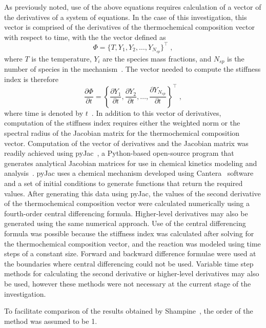 \documentclass[12pt]{ussci}
\begin{document}
As previously noted, use of the above equations requires calculation of a vector of the derivatives of a system of equations.
In the case of this investigation, this vector is comprised of the derivatives of the thermochemical composition vector with respect to time, with the the vector defined as
\begin{equation}
    \Phi = \{T, Y_1, Y_2, \dots, Y_{N_{sp}} \}^\intercal \;,
\end{equation}
where $T$ is the temperature, $Y_i$ are the species mass fractions, and $N_{sp}$ is the number of species in the mechanism~\cite{Niemeyer:2017}.
The vector needed to compute the stiffness index is therefore
\begin{equation}
    \frac{\partial \Phi}{\partial t} = \left\{\frac{\partial Y_1}{\partial t}, \frac{\partial Y_2}{\partial t}, \dots, \frac{\partial Y_{N_{sp}}}{\partial t} \right\}^\intercal \;,
\end{equation}
where time is denoted by $t$~\cite{Niemeyer:2017}.
In addition to this vector of derivatives, computation of the stiffness index requires either the weighted norm or the spectral radius of the Jacobian matrix for the thermochemical composition vector.
Computation of the vector of derivatives and the Jacobian matrix was readily achieved using pyJac~\cite{pyJac:1.0.2}, a Python-based open-source program that generates analytical Jacobian matrices for use in chemical kinetics modeling and analysis~\cite{Niemeyer:2017}.
pyJac uses a chemical mechanism developed using Cantera~\cite{Goodwin:2015aa} software and a set of initial conditions to generate functions that return the required values.
After generating this data using pyJac, the values of the second derivative of the thermochemical composition vector were calculated numerically using a fourth-order central differencing formula.
Higher-level derivatives may also be generated using the same numerical approach.
Use of the central differencing formula was possible because the stiffness index was calculated after solving for the thermochemical composition vector, and the reaction was modeled using time steps of a constant size.
Forward and backward difference formulae were used at the boundaries where central differencing could not be used.
Variable time step methods for calculating the second derivative or higher-level derivatives may also be used, however these methods were not necessary at the current stage of the investigation.

To facilitate comparison of the results obtained by Shampine~\cite{Shampine1985}, the order of the method was assumed to be 1.
\end{document}
